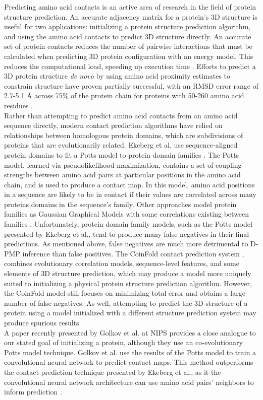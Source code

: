 \documentclass{article}
\begin{document}
Predicting amino acid contacts is an active area of research in the field of protein structure prediction. An accurate adjacency matrix for a protein's 3D structure is useful for two applications: initializing a protein structure prediction algorithm, and using the amino acid contacts to predict 3D structure directly. An accurate set of protein contacts reduces the number of pairwise interactions that must be calculated when predicting 3D protein configuration with an energy model. This reduces the computational load, speeding up execution time \cite{wuyun16}. 
Efforts to predict a 3D protein structure \emph{de novo} by using amino acid proximity estimates to constrain structure have proven partially successful, with an RMSD error range of 2.7-5.1 \AA{} across 75\% of the protein chain for proteins with 50-260 amino acid residues \cite{colwell11}.
\\ Rather than attempting to predict amino acid contacts from an amino acid sequence directly, modern contact prediction algorithms have relied on relationships between homologous protein domains, which are subdivisions of proteins that are evolutionarily related. Ekeberg et al. use sequence-aligned protein domains to fit a Potts model to protein domain families \cite{ekeberg13}. The Potts model, learned via pseudolikelihood maximization, contains a set of coupling strengths between amino acid pairs at particular positions in the amino acid chain, and is used to produce a contact map. In this model, amino acid positions in a sequence are likely to be in contact if their values are correlated across many proteins domains in the sequence's family. Other approaches model protein families as Gaussian Graphical Models with some correlations existing between families \cite{ma15}. Unfortunately, protein domain family models, such as the Potts model presented by Ekeberg et al., tend to produce many false negatives in their final predictions. As mentioned above, false negatives are much more detrimental to D-PMP inference than false positives. The CoinFold contact prediction system \cite{wang16}, combines evolutionary correlation models,  sequence-level features, and some elements of 3D structure prediction, which may produce a model more uniquely suited to initializing a physical protein structure prediction algorithm. However, the CoinFold model still focuses on minimizing total error and obtains a large number of false negatives. As well, attempting to predict the 3D structure of a protein using a model initialized with a different structure prediction system may produce spurious results. 
\\ A paper recently presented by Golkov et al. at NIPS provides a close analogue to our stated goal of initializing a protein, although they use an co-evolutionary Potts model technique. Golkov et al. use the results of the Potts model to train a convolutional neural network to predict contact maps. This method outperforms the contact prediction technique presented by Ekeberg et al., as it the convolutional neural network architecture can use amino acid pairs' neighbors to inform prediction \cite{golkov16}. 
\end{document}
